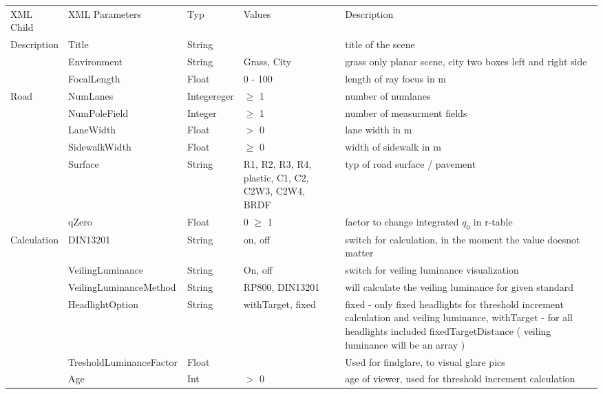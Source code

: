 \documentclass[10pt,a4paper]{report}
\begin{document}
\begin{landscape}
\pagestyle{empty}
\renewcommand{\arraystretch}{1.5}
	\begin{longtable}{lllp{4cm}p{6cm}}
	
	\rowcolor{dunkelgrau}
		XML  Child & XML Parameters & Typ & Values & Description \\
	
		Description & Title & String & & title of the scene \\
	 	& Environment & String & Grass, City & grass only planar scene, city two boxes left and right side \\
	 	& FocalLength & Float & 0 - 100 & length of ray focus in m \\
	
	\rowcolor{hellgrau}
		Road & NumLanes & Integereger & $\geq$ 1 & number of  numlanes \\\rowcolor{hellgrau}
		 & NumPoleField & Integer & $\geq$ 1 & number of measurment fields \\\rowcolor{hellgrau}
		 & LaneWidth & Float & $>$ 0 & lane width in m \\\rowcolor{hellgrau}
		 & SidewalkWidth & Float & $\geq$ 0 & width of sidewalk in m \\\rowcolor{hellgrau}
		 & Surface & String & R1, R2, R3, R4, plastic, C1, C2, C2W3, C2W4, BRDF & typ of road surface / pavement \\\rowcolor{hellgrau}
	 	 & qZero & Float & 0 $\geq$ 1 & factor to change integrated $q_0$ in r-table \\
	
		Calculation & DIN13201 & String & on, off & switch for calculation, in the moment the value doesnot matter  \\
		 & VeilingLuminance & String & On, off & switch for veiling luminance visualization \\
		 & VeilingLuminanceMethod & String & RP800, DIN13201 & will calculate the veiling luminance for given standard \\
		 & HeadlightOption & String & withTarget, fixed & fixed - only fixed headlights for threshold increment calculation and veiling luminance, withTarget - for all headlights included fixedTargetDistance ( veiling luminance will be an array )\\
		 & TresholdLuminanceFactor & Float & & Used for findglare, to visual glare pics \\
		 & Age & Int & $>$ 0 & age of viewer, used for threshold increment calculation \\
	

\end{longtable}
\end{landscape}
\end{document}

